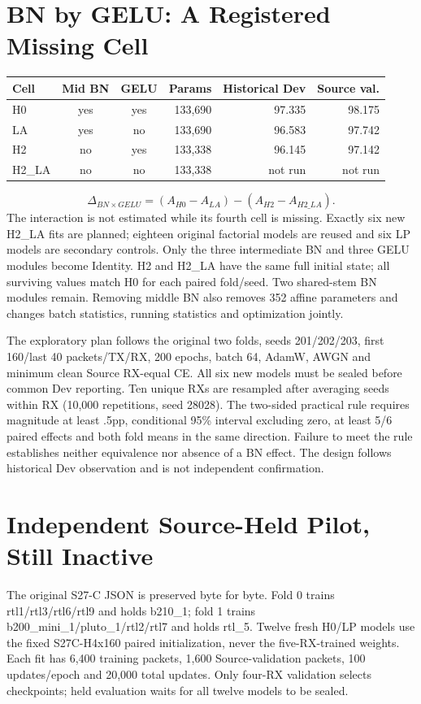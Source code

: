 \documentclass[10pt]{article}
\begin{document}
\section{BN by GELU: A Registered Missing Cell}
\begin{center}\small\begin{tabular}{lccrrr}\toprule
Cell&Mid BN&GELU&Params&Historical Dev&Source val.\\\midrule
H0&yes&yes&133,690&97.335&98.175\\
LA&yes&no&133,690&96.583&97.742\\
H2&no&yes&133,338&96.145&97.142\\
H2\_LA&no&no&133,338&not run&not run\\\bottomrule\end{tabular}\end{center}
\[
\Delta_{BN\times GELU}=(A_{H0}-A_{LA})-(A_{H2}-A_{H2\_LA}).
\]
The interaction is not estimated while its fourth cell is missing. Exactly six new H2\_LA fits are planned; eighteen original factorial models are reused and six LP models are secondary controls. Only the three intermediate BN and three GELU modules become Identity. H2 and H2\_LA have the same full initial state; all surviving values match H0 for each paired fold/seed. Two shared-stem BN modules remain. Removing middle BN also removes 352 affine parameters and changes batch statistics, running statistics and optimization jointly.

The exploratory plan follows the original two folds, seeds 201/202/203, first 160/last 40 packets/TX/RX, 200 epochs, batch 64, AdamW, AWGN and minimum clean Source RX-equal CE. All six new models must be sealed before common Dev reporting. Ten unique RXs are resampled after averaging seeds within RX (10,000 repetitions, seed 28028). The two-sided practical rule requires magnitude at least .5pp, conditional 95\% interval excluding zero, at least 5/6 paired effects and both fold means in the same direction. Failure to meet the rule establishes neither equivalence nor absence of a BN effect. The design follows historical Dev observation and is not independent confirmation.
\section{Independent Source-Held Pilot, Still Inactive}
The original S27-C JSON is preserved byte for byte. Fold 0 trains rtl1/rtl3/rtl6/rtl9 and holds b210\_1; fold 1 trains b200\_mini\_1/pluto\_1/rtl2/rtl7 and holds rtl\_5. Twelve fresh H0/LP models use the fixed S27C-H4x160 paired initialization, never the five-RX-trained weights. Each fit has 6,400 training packets, 1,600 Source-validation packets, 100 updates/epoch and 20,000 total updates. Only four-RX validation selects checkpoints; held evaluation waits for all twelve models to be sealed.
\end{document}
